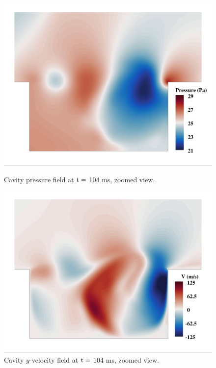 \begin{figure}
	\begin{minipage}{0.48\linewidth}
		\includegraphics[width=0.99\linewidth,trim={0.5em 0.5em 0.5em 0.5em},clip]{Chapters/HPROMResults/Images/cavity/pressure_example_zoom.png}
		\caption{\label{fig:cavityPressExampleZoom}Cavity pressure field at $\text{t} =$ 104 ms, zoomed view.}
	\end{minipage} \hspace{0.5em}
	\begin{minipage}{0.48\linewidth}
		\includegraphics[width=0.99\linewidth,trim={0.5em 0.5em 0.5em 0.5em},clip]{Chapters/HPROMResults/Images/cavity/y_vel_example_zoom.png}
		\caption{\label{fig:cavityVExampleZoom}Cavity $y$-velocity field at $\text{t} =$ 104 ms, zoomed view.}
	\end{minipage}
\end{figure}

